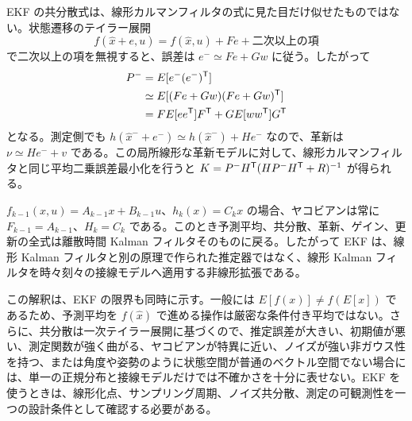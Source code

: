\begin{derivation}
EKF の共分散式は、線形カルマンフィルタの式に見た目だけ似せたものではない。状態遷移のテイラー展開
\begin{equation}
  f(\hat{x}+e,u)
  =
  f(\hat{x},u)
  +F e
  +\text{二次以上の項}
\end{equation}
で二次以上の項を無視すると、誤差は $e^-\simeq Fe+Gw$ に従う。したがって
\begin{align}
  P^-
  &=E[e^-(e^-)^{\mathsf{T}}]\\
  &\simeq E[(Fe+Gw)(Fe+Gw)^{\mathsf{T}}]\\
  &=F E[ee^{\mathsf{T}}]F^{\mathsf{T}}+G E[ww^{\mathsf{T}}]G^{\mathsf{T}}
\end{align}
となる。測定側でも $h(\hat{x}^-+e^-)\simeq h(\hat{x}^-)+He^-$ なので、革新は $\nu\simeq He^-+v$ である。この局所線形な革新モデルに対して、線形カルマンフィルタと同じ平均二乗誤差最小化を行うと $K=P^-H^{\mathsf{T}}(HP^-H^{\mathsf{T}}+R)^{-1}$ が得られる。
\end{derivation}

$f_{k-1}(x,u)=A_{k-1}x+B_{k-1}u$、$h_k(x)=C_kx$ の場合、ヤコビアンは常に $F_{k-1}=A_{k-1}$、$H_k=C_k$ である。このとき予測平均、共分散、革新、ゲイン、更新の全式は離散時間 Kalman フィルタそのものに戻る。したがって EKF は、線形 Kalman フィルタと別の原理で作られた推定器ではなく、線形 Kalman フィルタを時々刻々の接線モデルへ適用する非線形拡張である。

この解釈は、EKF の限界も同時に示す。一般には $E[f(x)]\ne f(E[x])$ であるため、予測平均を $f(\hat{x})$ で進める操作は厳密な条件付き平均ではない。さらに、共分散は一次テイラー展開に基づくので、推定誤差が大きい、初期値が悪い、測定関数が強く曲がる、ヤコビアンが特異に近い、ノイズが強い非ガウス性を持つ、または角度や姿勢のように状態空間が普通のベクトル空間でない場合には、単一の正規分布と接線モデルだけでは不確かさを十分に表せない。EKF を使うときは、線形化点、サンプリング周期、ノイズ共分散、測定の可観測性を一つの設計条件として確認する必要がある。

